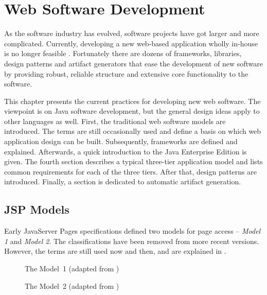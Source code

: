 \chapter{Web Software Development}
\label{toc:webdevel}

As the software industry has evolved, software projects have got 
larger and more complicated. Currently, developing a new web-based 
application wholly in-house is no longer feasible \citep{usingj2ee}. 
Fortunately there are dozens of frameworks, libraries, design patterns 
and artifact generators that ease the development of new software by 
providing robust, reliable structure and extensive core functionality 
to the software.

This chapter presents the current practices for developing new web 
software. The viewpoint is on Java software development, but the 
general design ideas apply to other languages as well. First, the 
traditional  web software models are introduced. The terms 
are still occasionally used and define a basis on which web 
application design can be built. Subsequently, frameworks are defined 
and explained. Afterwards, a quick introduction to the Java Enterprise 
Edition is given. The fourth section describes a typical three-tier 
application model and lists common requirements for each of the three 
tiers. After that, design patterns are introduced. Finally, a section 
is dedicated to automatic artifact generation.


\section{JSP Models}
\label{toc:webdevel:jspmodels}

Early JavaServer Pages specifications defined two models for 
 page access -- \textsl{Model 1} and \textsl{Model 2}. The 
classifications have been removed from more recent versions. However, 
the terms are still used now and then, and are explained in 
\citep{jsppractices}.

\begin{figure}
\begin{center}
  \label{fig:jspmodel1}
  \caption{The  Model~1 (adapted from 
  \citep{jsppractices})}
  \label{fig:jspmodel2}
  \caption{The  Model~2 (adapted from 
  \citep{jsppractices})}
\end{center}
\end{figure}

